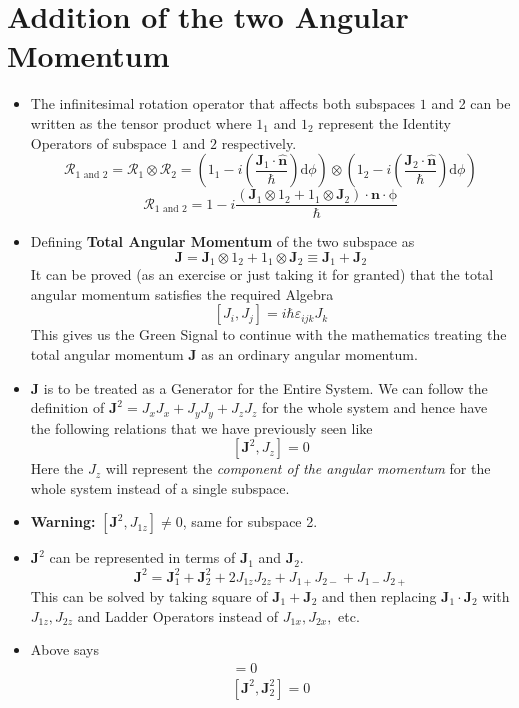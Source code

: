 \documentclass[11pt]{article}
\newcommand{\hb}{\hbar}
\renewcommand{\vec}{\mathbf}
\begin{document}
{\section{Addition of the two Angular Momentum}
\begin{itemize}
	\item The infinitesimal rotation operator that affects both subspaces $1$ and 2 can be written as the tensor product where $1_1$ and $1_2$ represent the Identity Operators of subspace $1$ and $2$ respectively. 
		\[ \mathcal R_{1 \text{ and } 2} = 
		\mathcal R_1 \otimes \mathcal R_2 = 
		\left( 1_1 - i \left(\frac{\vec{J}_1 \cdot  \hat{\vec{n}}}{\hb}\right) \mathrm{d} \phi
			\right) \otimes 
		\left( 1_2 - i \left(\frac{\vec{J}_2 \cdot  \hat{\vec{n}}}{\hb}\right) \mathrm{d} \phi
		\right) \]  \[\mathcal R_{1 \text{ and } 2} =  1 - i\frac{(\vec{J}_1 \otimes 1_{2} + 1_{1} \otimes \vec{J}_2 ) \cdot  \vec{n} \cdot  \mathrm \phi}{ \hb}
		\] 
	\item Defining \textbf{Total Angular Momentum} of the two subspace as 
		\[
\vec{J} = \vec{J}_1 \otimes 1_{2} + 1_{1} \otimes \vec{J}_2  \equiv \vec{J}_1 + \vec{J}_2
		\] 
It can be proved (as an exercise or just taking it for granted) that the total angular momentum satisfies the required Algebra
\[
	[ J_i , J_j ] = i \hb \varepsilon_{ijk} J_k 
\] 
This gives us the Green Signal to continue with the mathematics treating the total angular momentum $\vec{J}$ as an ordinary angular momentum.
\item $\vec{J}$ is to be treated as a Generator for the Entire System. We can follow the definition of $\vec{J}^2 = J_x J_x + J_y J_y + J_z J_z$ for the whole system and hence have the following relations that we have previously seen like 
	\[
		[\vec{J}^2 , J_z ] = 0 
	\] 
Here the $J_z$ will represent the \emph{component of the angular momentum} for the whole system instead of a single subspace.
\item \textbf{Warning:} $[\vec{J}^2 , J_{1z}] \neq  0$, same for subspace 2.
\item $\vec{J}^2$ can be represented in terms of $\vec{J}_1$ and $\vec{J}_2$.
	\begin{equation}
		\vec{J}^2 = \vec{J}_1 ^2 + \vec{J}_2 ^2 + 2 J_{1z} J_{2z} + J_{1+} J_{2-} + J_{1-} J_{2+}	
	\end{equation} 
	This can be solved by taking square of $\vec{J}_1 + \vec{J}_2$ and then replacing $\vec{J}_1 \cdot \vec{J}_2$ with $J_{1z}, J_{2z}$ and Ladder Operators instead of $J_{1x},J_{2x},$ etc. 
\item Above says 
\begin{align}
	[\vec{J}^2 , \vec{J}_1^2 ] = 0\\
	[\vec{J}^2 , \vec{J}_2^2 ] = 0
\end{align}
\end{itemize}






}
\end{document}

